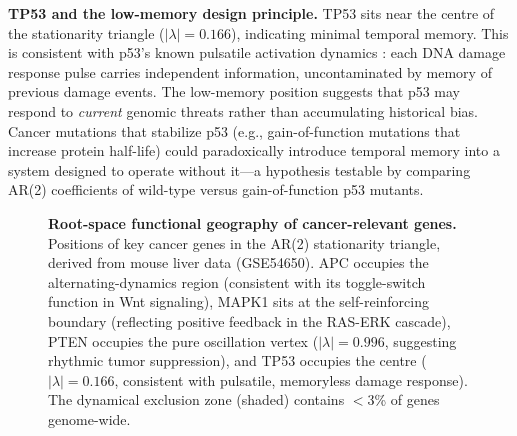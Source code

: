 \documentclass[11pt,letterpaper]{article}
\begin{document}
\textbf{TP53 and the low-memory design principle.} TP53 sits near the centre of the stationarity triangle ($|\lambda| = 0.166$), indicating minimal temporal memory. This is consistent with p53's known pulsatile activation dynamics \citep{purvis2012}: each DNA damage response pulse carries independent information, uncontaminated by memory of previous damage events. The low-memory position suggests that p53 may respond to \textit{current} genomic threats rather than accumulating historical bias. Cancer mutations that stabilize p53 (e.g., gain-of-function mutations that increase protein half-life) could paradoxically introduce temporal memory into a system designed to operate without it---a hypothesis testable by comparing AR(2) coefficients of wild-type versus gain-of-function p53 mutants.

\begin{figure}[H]
\centering
{}
\caption{\textbf{Root-space functional geography of cancer-relevant genes.} Positions of key cancer genes in the AR(2) stationarity triangle, derived from mouse liver data (GSE54650). APC occupies the alternating-dynamics region (consistent with its toggle-switch function in Wnt signaling), MAPK1 sits at the self-reinforcing boundary (reflecting positive feedback in the RAS-ERK cascade), PTEN occupies the pure oscillation vertex ($|\lambda| = 0.996$, suggesting rhythmic tumor suppression), and TP53 occupies the centre ($|\lambda| = 0.166$, consistent with pulsatile, memoryless damage response). The dynamical exclusion zone (shaded) contains $<$3\% of genes genome-wide.}
\label{fig:rootspace_cancer}
\end{figure}
\end{document}
